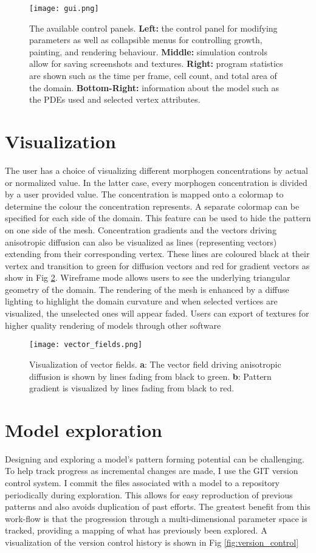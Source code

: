 \begin{figure}[p]
	\centering
	\texttt{[image: gui.png]}	
	\caption{The available control panels. \textbf{Left:} the control panel for modifying parameters as well as collapsible menus for controlling growth, painting, and rendering behaviour. \textbf{Middle:} simulation controls allow for saving screenshots and textures. \textbf{Right:} program statistics are shown such as the time per frame, cell count, and total area of the domain. \textbf{Bottom-Right:} information about the model such as the PDEs used and selected vertex attributes.} 
	\label{fig:GUIexample}
\end{figure}


\section{Visualization}
The user has a choice of visualizing different morphogen concentrations by actual or normalized value. In the latter case, every morphogen concentration is divided by a user provided value. The concentration is mapped onto a colormap to determine the colour the concentration represents. A separate colormap can be specified for each side of the domain. This feature can be used to hide the pattern on one side of the mesh. Concentration gradients and the vectors driving anisotropic diffusion can also be visualized as lines (representing vectors) extending from their corresponding vertex. These lines are coloured black at their vertex and transition to green for diffusion vectors and red for gradient vectors as show in Fig \ref{fig:vector_fields}. Wireframe mode allows users to see the underlying triangular geometry of the domain. The rendering of the mesh is enhanced by a diffuse lighting to highlight the domain curvature and when selected vertices are visualized, the unselected ones will appear faded. Users can export of textures for higher quality rendering of models through other software

\begin{figure}[ht]
	\centering
	\texttt{[image: vector\_fields.png]}	
	\caption{Visualization of vector fields. \textbf{a}: The vector field driving anisotropic diffusion is shown by lines fading from black to green. \textbf{b}: Pattern gradient is visualized by lines fading from black to red.} 
	\label{fig:vector_fields}
\end{figure}

\section{Model exploration}
Designing and exploring a model's pattern forming potential can be challenging. To help track progress as incremental changes are made, I use the GIT version control system. I commit the files associated with a model to a repository periodically during exploration. This allows for easy reproduction of previous patterns and also avoids duplication of past efforts. The greatest benefit from this work-flow is that the progression through a multi-dimensional parameter space is tracked, providing a mapping of what has previously been explored. A visualization of the version control history is shown in Fig \ref{fig:version_control}

